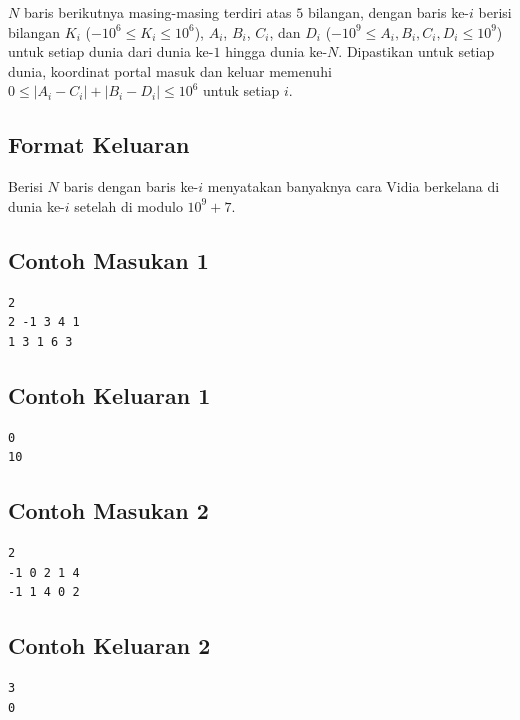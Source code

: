 \documentclass{article}
\begin{document}
$N$ baris berikutnya masing-masing terdiri atas $5$ bilangan, dengan baris ke-$i$ berisi bilangan $K_{i}$ ($-10^6 \leq K_{i} \leq 10^6$), $A_{i}$, $B_{i}$, $C_{i}$, dan $D_{i}$ ($-10^9 \leq A_{i}, B_{i}, C_{i}, D_{i} \leq  10^9$) untuk setiap dunia dari dunia ke-$1$ hingga dunia ke-$N$. Dipastikan untuk setiap dunia, koordinat portal masuk dan keluar memenuhi $0 \leq |A_{i}-C_{i}|+|B_{i}-D_{i}| \leq 10^6$ untuk setiap $i$.

\subsection*{Format Keluaran}
Berisi $N$ baris dengan baris ke-$i$ menyatakan banyaknya cara Vidia berkelana di dunia ke-$i$ setelah di modulo $10^9 + 7$.

\begin{multicols}{2}
\subsection*{Contoh Masukan 1}
\begin{lstlisting}
2
2 -1 3 4 1
1 3 1 6 3
\end{lstlisting}
\columnbreak

\subsection*{Contoh Keluaran 1}
\begin{lstlisting}
0
10
\end{lstlisting}
\vfill
\null
\end{multicols}

\begin{multicols}{2}
\subsection*{Contoh Masukan 2}
\begin{lstlisting}
2
-1 0 2 1 4
-1 1 4 0 2
\end{lstlisting}
\columnbreak

\subsection*{Contoh Keluaran 2}
\begin{lstlisting}
3
0
\end{lstlisting}
\vfill
\null
\end{multicols}

\pagebreak
\end{document}
